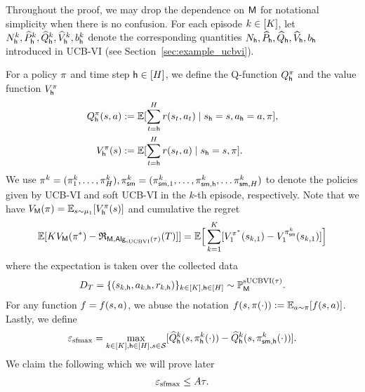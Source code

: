 Throughout the proof, we may drop the dependence on ${\mathsf{M}}$ for notational simplicity when there is no confusion. For each episode $k\in[{K}]$, let ${N}^k_{\mathsf{h}},\widehat{P}^k_{\mathsf{h}},{\widehat{{Q}}}^k_{\mathsf{h}},{\widehat{{{V}}}}^k_{\mathsf{h}},{b}^k_{\mathsf{h}}$ denote the corresponding quantities ${N}_{\mathsf{h}},\widehat{P}_{\mathsf{h}},{\widehat{{Q}}}_{\mathsf{h}},{\widehat{{{V}}}}_{\mathsf{h}},{b}_{\mathsf{h}}$  introduced in UCB-VI (see Section~\ref{sec:example_ucbvi}). 

For a policy ${\pi}$ and time step ${\mathsf{h}}\in[{H}]$, we define the Q-function ${Q}_{\mathsf{h}}^{\pi}$ and the value function ${{V}}_{\mathsf{h}}^{\pi}$
\begin{align*}
{Q}_{\mathsf{h}}^{\pi}({s},{a})&:=\mathbb{E}[\sum_{t={\mathsf{h}}}^{H} {r}({s}_t,{a}_t)\mid {s}_{\mathsf{h}}={s},{a}_{\mathsf{h}}={a},{\pi}],\\  
{{V}}_{\mathsf{h}}^{\pi}({s})&:=\mathbb{E}[\sum_{t={\mathsf{h}}}^{H} {r}({s}_t,{a})\mid {s}_{\mathsf{h}}={s},{\pi}].
\end{align*}
 We use ${\pi}^{k}=({\pi}^k_1,\ldots,{\pi}^k_{H}),{\pi}^k_{{\mathsf{sm}}}=({\pi}^k_{{\mathsf{sm}},1},\ldots,{\pi}^k_{{\mathsf{sm}},{\mathsf{h}}},\ldots{\pi}^k_{{\mathsf{sm}},{H}})$ to denote the policies given by UCB-VI and soft UCB-VI in the $k$-th episode, respectively. Note that we have ${{V}}_{\mathsf{M}}({\pi})=\mathbb{E}_{{s}\sim{\mu_1}}[{{V}}_{\mathsf{h}}^{\pi}({s})]$ and cumulative the regret 
 $$
 \mathbb{E}[{K}{{V}}_{\mathsf{M}}({\pi}^*)-{\mathfrak{R}}_{{\mathsf{M}},{\mathsf{Alg}}_{\mathrm{sUCBVI}}({\tau})}({T})]]=\mathbb{E}\Big[\sum_{k=1}^{{K}}[{{V}}_1^{{\pi^*}}({s}_{k,1})-{{V}}_1^{{\pi}^k_{{\mathsf{sm}}}}({s}_{k,1})
 ]\Big]
 $$ 
 where the expectation is taken over the collected data $${D}_{T}=\{({s}_{k,{\mathsf{h}}},{a}_{k,{\mathsf{h}}},{r}_{k,{\mathsf{h}}})\}_{k\in[{K}],{\mathsf{h}}\in[{H}]}\sim\mathbb{P}_{\mathsf{M}}^{{\mathrm{sUCBVI}}({\tau})}.$$ 
 For any function $f=f({s},{a})$, we abuse the notation $f({s},{\pi}(
\cdot)):=\mathbb{E}_{{a}\sim{\pi}}[f({s},{a})]$. Lastly, we define
\begin{align*}
{\varepsilon_{\mathrm{sfmax}}}=\max_{k\in[{K}],{\mathsf{h}}\in[{H}],{s}\in{\mathcal{S}}}[{\widehat{{Q}}}^k_{\mathsf{h}}({s},{\pi}^k_{{\mathsf{h}}}(\cdot))-{\widehat{{Q}}}^k_{\mathsf{h}}({s},{\pi}^k_{{\mathsf{sm}},{\mathsf{h}}}(\cdot)) ].
\end{align*}
We claim the following which we will prove later 
\begin{align}\label{eq:epstemp_control}
  {\varepsilon_{\mathrm{sfmax}}}\leq {A}{\tau}.  
\end{align}

